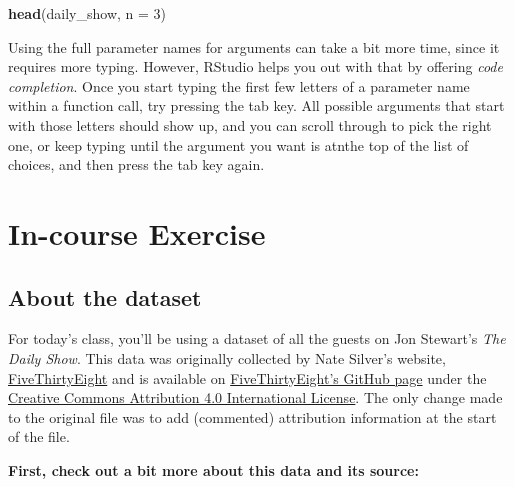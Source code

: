 \documentclass[]{book}
\makeatletter
\newenvironment{Shaded}{\begin{snugshade}}{\end{snugshade}}
\newcommand{\KeywordTok}[1]{\textcolor[rgb]{0.13,0.29,0.53}{\textbf{#1}}}
\newcommand{\DataTypeTok}[1]{\textcolor[rgb]{0.13,0.29,0.53}{#1}}
\newcommand{\DecValTok}[1]{\textcolor[rgb]{0.00,0.00,0.81}{#1}}
\newcommand{\NormalTok}[1]{#1}
\newenvironment{kframe}{%
\medskip{}
\setlength{\fboxsep}{.8em}
 \def\at@end@of@kframe{}%
 \ifinner\ifhmode%
  \def\at@end@of@kframe{\end{minipage}}%
  \begin{minipage}{\columnwidth}%
 \fi\fi%
 \def\FrameCommand##1{\hskip\@totalleftmargin \hskip-\fboxsep
 \colorbox{shadecolor}{##1}\hskip-\fboxsep
     \hskip-\linewidth \hskip-\@totalleftmargin \hskip\columnwidth}%
 \MakeFramed {\advance\hsize-\width
   \@totalleftmargin\z@ \linewidth\hsize
   \@setminipage}}%
 {\par\unskip\endMakeFramed%
 \at@end@of@kframe}
\renewenvironment{Shaded}{\begin{kframe}}{\end{kframe}}
\newenvironment{rmdblock}[1]
  {
  \begin{itemize}
  \renewcommand{\labelitemi}{
    \raisebox{-.7\height}[0pt][0pt]{
      {\setkeys{Gin}{width=3em,keepaspectratio}\texttt{[image: images/\#1]}}
    }
  }
  \setlength{\fboxsep}{1em}
  \begin{kframe}
  \item
  }
  {
  \end{kframe}
  \end{itemize}
  }
\newenvironment{rmdtip}
  {\begin{rmdblock}{tip}}
  {\end{rmdblock}}
\theoremstyle{definition}
\theoremstyle{definition}
\theoremstyle{definition}
\theoremstyle{remark}
\makeatother
\begin{document}
\begin{Shaded}
\begin{Highlighting}[]
\KeywordTok{head}\NormalTok{(daily_show, }\DataTypeTok{n =} \DecValTok{3}\NormalTok{)}
\end{Highlighting}
\end{Shaded}

\begin{rmdtip}
Using the full parameter names for arguments can take a bit more time,
since it requires more typing. However, RStudio helps you out with that
by offering \emph{code completion}. Once you start typing the first few
letters of a parameter name within a function call, try pressing the tab
key. All possible arguments that start with those letters should show
up, and you can scroll through to pick the right one, or keep typing
until the argument you want is atnthe top of the list of choices, and
then press the tab key again.
\end{rmdtip}

\section{In-course Exercise}\label{in-course-exercise}

\subsection{About the dataset}\label{about-the-dataset}

For today's class, you'll be using a dataset of all the guests on Jon
Stewart's \emph{The Daily Show}. This data was originally collected by
Nate Silver's website,
\href{http://fivethirtyeight.com}{FiveThirtyEight} and is available on
\href{https://github.com/fivethirtyeight/data/tree/master/daily-show-guests}{FiveThirtyEight's
GitHub page} under the
\href{http://creativecommons.org/licenses/by/4.0/}{Creative Commons
Attribution 4.0 International License}. The only change made to the
original file was to add (commented) attribution information at the
start of the file.

\textbf{First, check out a bit more about this data and its source:}
\end{document}
